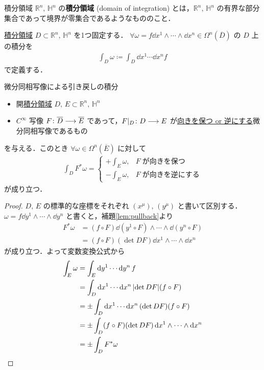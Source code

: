 \documentclass[geometry_main]{subfiles}
\begin{document}
\begin{mydef}[label=def:domain-of-integration]{積分領域}
    $\mathbb{R}^n,\, \mathbb{H}^n$ の\textbf{積分領域} (domain of integration) とは，$\mathbb{R}^n,\, \mathbb{H}^n$ の有界な部分集合であって境界が零集合であるようなもののこと．
\end{mydef}

\hyperref[def:domain-of-integration]{積分領域} $D \subset \mathbb{R}^n,\, \mathbb{H}^n$ を1つ固定する．
$\forall \omega = f \dd{x^1} \wedge \cdots \wedge \dd{x^n} \in \Omega^n (\overline{D})$ の $D$ 上の積分を
\begin{align}
    \int_D \omega  \coloneqq \int_D \dd{x^1} \cdots \dd{x^n} f
\end{align}
で定義する．

\begin{myprop}[label=prop:integral-pullback]{微分同相写像による引き戻しの積分}
    
    \begin{itemize}
        \item 開\hyperref[def:domain-of-integration]{積分領域} $D,\, E \subset \mathbb{R}^n,\, \mathbb{H}^n$
        \item $C^\infty$ 写像 $F \colon \overline{D} \longrightarrow \overline{E}$ であって，$F|_D \colon D \longrightarrow E$ が\hyperref[def:orientation-preserving]{向きを保つ or 逆にする}微分同相写像であるもの
    \end{itemize}
    を与える．このとき $\forall \omega \in \Omega^n (\overline{E})$ に対して
    \begin{align}
        \int_D F^* \omega = 
        \begin{cases}
            +\int_E \omega, &F\; \text{が向きを保つ} \\
            -\int_E \omega, &F\; \text{が向きを逆にする}
        \end{cases}
    \end{align}
    が成り立つ．
\end{myprop}

\begin{proof}
    $D,\, E$ の標準的な座標をそれぞれ $(x^\mu),\, (y^\mu)$ と書いて区別する．
    $\omega = f \dd{y^1} \wedge \cdots \wedge \dd{y^n}$ と書くと，補題\ref{lem:pullback}より
    \begin{align}
        F^* \omega 
        &= (f \circ F) \dd{(y^1 \circ F)} \wedge \cdots \wedge \dd{(y^n \circ F)} \\
        &= (f \circ F) (\det DF)\dd{x^1} \wedge \cdots \wedge \dd{x^n}
    \end{align}
    が成り立つ．よって変数変換公式から
    \begin{align}
        \int_E \omega
        &= \int_E \dd{y^1} \cdots \dd{y^n} f \\
        &= \int_D \dd{x^1} \cdots \dd{x^n} \abs{\det DF} (f \circ F) \\
        &= \pm \int_D \dd{x^1} \cdots \dd{x^n} (\det DF) (f \circ F) \\
        &= \pm \int_D (f \circ F) (\det DF) \dd{x^1} \wedge \cdots \wedge \dd{x^n} \\
        &= \pm \int_D F^* \omega
    \end{align}
\end{proof}
\end{document}
